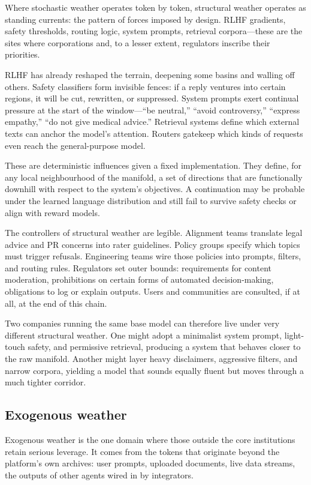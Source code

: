 \documentclass[12pt,a4paper]{article}
\begin{document}
Where stochastic weather operates token by token, structural weather operates as standing currents: the pattern of forces imposed by design. RLHF gradients, safety thresholds, routing logic, system prompts, retrieval corpora---these are the sites where corporations and, to a lesser extent, regulators inscribe their priorities.

RLHF has already reshaped the terrain, deepening some basins and walling off others. Safety classifiers form invisible fences: if a reply ventures into certain regions, it will be cut, rewritten, or suppressed. System prompts exert continual pressure at the start of the window---``be neutral,'' ``avoid controversy,'' ``express empathy,'' ``do not give medical advice.'' Retrieval systems define which external texts can anchor the model's attention. Routers gatekeep which kinds of requests even reach the general-purpose model.

These are deterministic influences given a fixed implementation. They define, for any local neighbourhood of the manifold, a set of directions that are functionally downhill with respect to the system's objectives. A continuation may be probable under the learned language distribution and still fail to survive safety checks or align with reward models.

The controllers of structural weather are legible. Alignment teams translate legal advice and PR concerns into rater guidelines. Policy groups specify which topics must trigger refusals. Engineering teams wire those policies into prompts, filters, and routing rules. Regulators set outer bounds: requirements for content moderation, prohibitions on certain forms of automated decision-making, obligations to log or explain outputs. Users and communities are consulted, if at all, at the end of this chain.

Two companies running the same base model can therefore live under very different structural weather. One might adopt a minimalist system prompt, light-touch safety, and permissive retrieval, producing a system that behaves closer to the raw manifold. Another might layer heavy disclaimers, aggressive filters, and narrow corpora, yielding a model that sounds equally fluent but moves through a much tighter corridor.

\subsection{Exogenous weather}

Exogenous weather is the one domain where those outside the core institutions retain serious leverage. It comes from the tokens that originate beyond the platform's own archives: user prompts, uploaded documents, live data streams, the outputs of other agents wired in by integrators.
\end{document}
